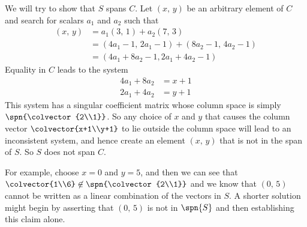 We will try to show that $S$ spans $C$.  Let $(x,\,y)$ be an arbitrary element of $C$ and search for scalars $a_1$ and $a_2$ such that
%
\begin{align*}
(x,\,y)&=a_1(3,\,1) + a_2(7,\,3)\\
&=(4a_1-1,\,2a_1-1)+(8a_2-1,\,4a_2-1)\\
&=(4a_1+8a_2-1,2a_1+4a_2-1)
\end{align*}
%
Equality in $C$ leads to the system
%
\begin{align*}
4a_1+8a_2&=x+1\\
2a_1+4a_2&=y+1
\end{align*}
%
This system has a singular coefficient matrix whose column space is simply $\spn{\colvector{2\\1}}$.  So any choice of $x$ and $y$ that causes the column vector $\colvector{x+1\\y+1}$ to lie outside the column space will lead to an inconsistent system, and hence create an element $(x,\,y)$ that is not in the span of $S$.  So $S$ does not span $C$.\par
%
For example, choose $x=0$ and $y=5$, and then we can see that $\colvector{1\\6}\not\in\spn{\colvector{2\\1}}$ and we know that $(0,\,5)$ cannot be written as a linear combination of the vectors in $S$.  A shorter solution might begin by asserting that $(0,\,5)$ is not in $\spn{S}$ and then establishing this claim alone.